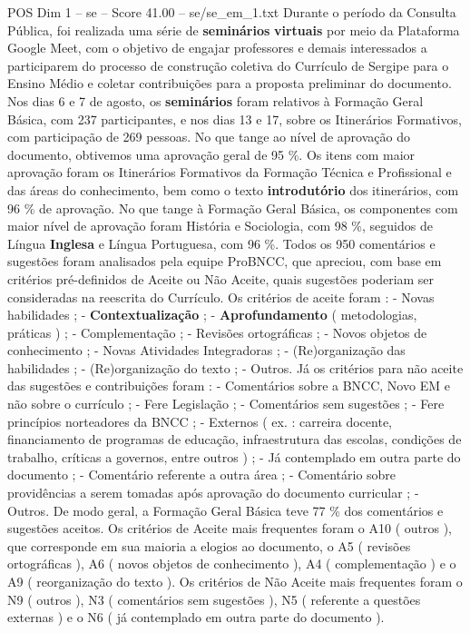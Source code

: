 \begin{textsample}{POS Dim 1 – se – Score 41.00 – se/se\_em\_1.txt}
Durante o período da Consulta Pública, foi realizada uma série de \textbf{seminários} \textbf{virtuais} por meio da Plataforma Google Meet, com o objetivo de engajar professores e demais interessados a participarem do processo de construção coletiva do Currículo de Sergipe para o Ensino Médio e coletar contribuições para a proposta preliminar do documento.
Nos dias 6 e 7 de agosto, os \textbf{seminários} foram relativos à Formação Geral Básica, com 237 participantes, e nos dias 13 e 17, sobre os Itinerários Formativos, com participação de 269 pessoas.
No que tange ao nível de aprovação do documento, obtivemos uma aprovação geral de 95 \%.
Os itens com maior aprovação foram os Itinerários Formativos da Formação Técnica e Profissional e das áreas do conhecimento, bem como o texto \textbf{introdutório} dos itinerários, com 96 \% de aprovação.
No que tange à Formação Geral Básica, os componentes com maior nível de aprovação foram História e Sociologia, com 98 \%, seguidos de Língua \textbf{Inglesa} e Língua Portuguesa, com 96 \%.
Todos os 950 comentários e sugestões foram analisados pela equipe ProBNCC, que apreciou, com base em critérios pré-definidos de Aceite ou Não Aceite, quais sugestões poderiam ser consideradas na reescrita do Currículo.
Os critérios de aceite foram : - Novas habilidades ; - \textbf{Contextualização} ; - \textbf{Aprofundamento} ( metodologias, práticas ) ; - Complementação ; - Revisões ortográficas ; - Novos objetos de conhecimento ; - Novas Atividades Integradoras ; - (Re)organização das habilidades ; - (Re)organização do texto ; - Outros.
Já os critérios para não aceite das sugestões e contribuições foram : - Comentários sobre a BNCC, Novo EM e não sobre o currículo ; - Fere Legislação ; - Comentários sem sugestões ; - Fere princípios norteadores da BNCC ; - Externos ( ex. : carreira docente, financiamento de programas de educação, infraestrutura das escolas, condições de trabalho, críticas a governos, entre outros ) ; - Já contemplado em outra parte do documento ; - Comentário referente a outra área ; - Comentário sobre providências a serem tomadas após aprovação do documento curricular ; - Outros.
De modo geral, a Formação Geral Básica teve 77 \% dos comentários e sugestões aceitos.
Os critérios de Aceite mais frequentes foram o A10 ( outros ), que corresponde em sua maioria a elogios ao documento, o A5 ( revisões ortográficas ), A6 ( novos objetos de conhecimento ), A4 ( complementação ) e o A9 ( reorganização do texto ).
Os critérios de Não Aceite mais frequentes foram o N9 ( outros ), N3 ( comentários sem sugestões ), N5 ( referente a questões externas ) e o N6 ( já contemplado em outra parte do documento ).

\end{textsample}

